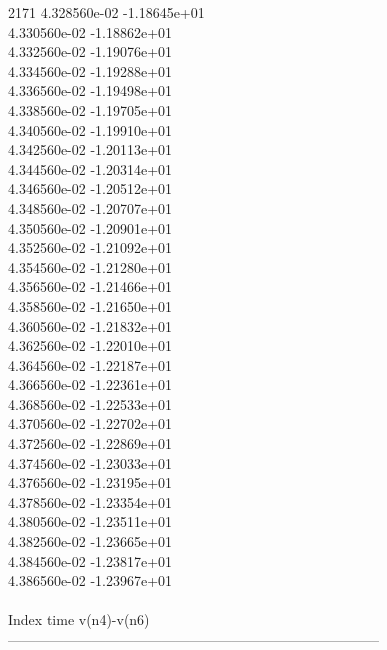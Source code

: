 2171	4.328560e-02	-1.18645e+01	\\ 	4.330560e-02	-1.18862e+01	\\ 	4.332560e-02	-1.19076e+01	\\ 	4.334560e-02	-1.19288e+01	\\ 	4.336560e-02	-1.19498e+01	\\ 	4.338560e-02	-1.19705e+01	\\ 	4.340560e-02	-1.19910e+01	\\ 	4.342560e-02	-1.20113e+01	\\ 	4.344560e-02	-1.20314e+01	\\ 	4.346560e-02	-1.20512e+01	\\ 	4.348560e-02	-1.20707e+01	\\ 	4.350560e-02	-1.20901e+01	\\ 	4.352560e-02	-1.21092e+01	\\ 	4.354560e-02	-1.21280e+01	\\ 	4.356560e-02	-1.21466e+01	\\ 	4.358560e-02	-1.21650e+01	\\ 	4.360560e-02	-1.21832e+01	\\ 	4.362560e-02	-1.22010e+01	\\ 	4.364560e-02	-1.22187e+01	\\ 	4.366560e-02	-1.22361e+01	\\ 	4.368560e-02	-1.22533e+01	\\ 	4.370560e-02	-1.22702e+01	\\ 	4.372560e-02	-1.22869e+01	\\ 	4.374560e-02	-1.23033e+01	\\ 	4.376560e-02	-1.23195e+01	\\ 	4.378560e-02	-1.23354e+01	\\ 	4.380560e-02	-1.23511e+01	\\ 	4.382560e-02	-1.23665e+01	\\ 	4.384560e-02	-1.23817e+01	\\ 	4.386560e-02	-1.23967e+01	\\ \hline
\\ \hline
Index   time            v(n4)-v(n6)     \\ \hline
--------------------------------------------------------------------------------\\ \hline

